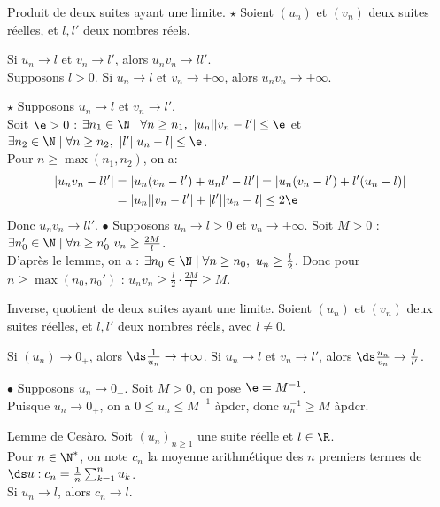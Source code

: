 \documentclass[11pt]{article}
\begin{document}
\begin{prop}{Produit de deux suites ayant une limite. $\star$}{}
    Soient $(u_n)$ et $(v_n)$ deux suites réelles, et $l,l'$ deux nombres réels.
    \begin{center}
        Si $u_n\to l$ et $v_n\to l'$, alors $u_nv_n\to ll'$.\\
        Supposons $l>0$. Si $u_n\to l$ et $v_n\to+\infty$, alors $u_nv_n\to+\infty$.
    \end{center}
    \tcblower
    $\star$ Supposons $u_n\to l$ et $v_n\to l'$.\\
    Soit $\e>0$ : $\exists n_1 \in \N \mid \forall n \geq n_1, ~ |u_n||v_n - l'| \leq \e$ et $\exists n_2 \in \N \mid \forall n \geq n_2, ~ |l'||u_n - l| \leq \e$.\\
    Pour $n\geq\max(n_1,n_2)$, on a:
    \begin{align*}
        |u_nv_n-ll'| &= |u_n(v_n-l') + u_nl' -ll'| = |u_n(v_n-l') + l'(u_n-l)|\\
        &=|u_n||v_n-l'| + |l'||u_n-l|\leq 2\e
    \end{align*}
    Donc $u_nv_n\to ll'$.\n
    $\bullet$ Supposons $u_n\to l>0$ et $v_n\to+\infty$. Soit $M>0$ : $\exists n_0'\in\N \mid \forall n \geq n_0' ~ v_n\geq\frac{2M}{l}$.\\
    D'après le lemme, on a : $\exists n_0 \in \N \mid \forall n \geq n_0, ~ u_n\geq\frac{l}{2}$. Donc pour $n\geq\max(n_0,n_0')$ : $u_nv_n\geq\frac{l}{2}\cdot\frac{2M}{l}\geq M$.
\end{prop}

\begin{prop}{Inverse, quotient de deux suites ayant une limite.}{}
    Soient $(u_n)$ et $(v_n)$ deux suites réelles, et $l,l'$ deux nombres réels, avec $l\neq0$.
    \begin{center}
        Si $(u_n)\to0_+$, alors $\ds\frac{1}{u_n}\to+\infty$. \qquad Si $u_n\to l$ et $v_n\to l'$, alors $\ds\frac{u_n}{v_n}\to\frac{l}{l'}$. 
    \end{center}
    \tcblower
    $\bullet$ Supposons $u_n\to0_+$. Soit $M>0$, on pose $\e=M^{-1}$.\\
    Puisque $u_n\to0_+$, on a $0\leq u_n \leq M^{-1}$ àpdcr, donc $u_n^{-1}\geq M$ àpdcr.
\end{prop}

\begin{prop}{Lemme de Cesàro.}{}
    Soit $(u_n)_{n\geq1}$ une suite réelle et $l\in\R$.\\
    Pour $n\in\N^*$, on note $c_n$ la moyenne arithmétique des $n$ premiers termes de $\ds u: c_n = \frac{1}{n}\sum_{k=1}^nu_k$.\\
    Si $u_n\to l$, alors $c_n\to l$.
\end{prop}
\end{document}
